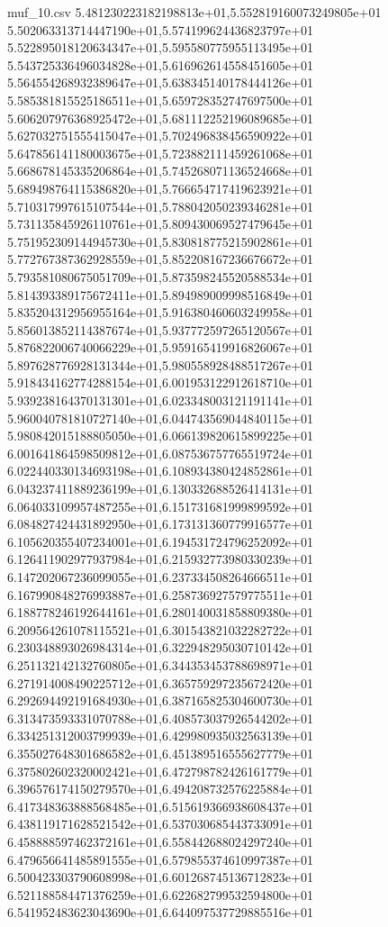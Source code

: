 \begin{filecontents*}{muf_10.csv}
5.481230223182198813e+01,5.552819160073249805e+01
5.502063313714447190e+01,5.574199624436823797e+01
5.522895018120634347e+01,5.595580775955113495e+01
5.543725336496034828e+01,5.616962614558451605e+01
5.564554268932389647e+01,5.638345140178444126e+01
5.585381815525186511e+01,5.659728352747697500e+01
5.606207976368925472e+01,5.681112252196089685e+01
5.627032751555415047e+01,5.702496838456590922e+01
5.647856141180003675e+01,5.723882111459261068e+01
5.668678145335206864e+01,5.745268071136524668e+01
5.689498764115386820e+01,5.766654717419623921e+01
5.710317997615107544e+01,5.788042050239346281e+01
5.731135845926110761e+01,5.809430069527479645e+01
5.751952309144945730e+01,5.830818775215902861e+01
5.772767387362928559e+01,5.852208167236676672e+01
5.793581080675051709e+01,5.873598245520588534e+01
5.814393389175672411e+01,5.894989009998516849e+01
5.835204312956955164e+01,5.916380460603249958e+01
5.856013852114387674e+01,5.937772597265120567e+01
5.876822006740066229e+01,5.959165419916826067e+01
5.897628776928131344e+01,5.980558928488517267e+01
5.918434162774288154e+01,6.001953122912618710e+01
5.939238164370131301e+01,6.023348003121191141e+01
5.960040781810727140e+01,6.044743569044840115e+01
5.980842015188805050e+01,6.066139820615899225e+01
6.001641864598509812e+01,6.087536757765519724e+01
6.022440330134693198e+01,6.108934380424852861e+01
6.043237411889236199e+01,6.130332688526414131e+01
6.064033109957487255e+01,6.151731681999899592e+01
6.084827424431892950e+01,6.173131360779916577e+01
6.105620355407234001e+01,6.194531724796252092e+01
6.126411902977937984e+01,6.215932773980330239e+01
6.147202067236099055e+01,6.237334508264666511e+01
6.167990848276993887e+01,6.258736927579775511e+01
6.188778246192644161e+01,6.280140031858809380e+01
6.209564261078115521e+01,6.301543821032282722e+01
6.230348893026984314e+01,6.322948295030710142e+01
6.251132142132760805e+01,6.344353453788698971e+01
6.271914008490225712e+01,6.365759297235672420e+01
6.292694492191684930e+01,6.387165825304600730e+01
6.313473593331070788e+01,6.408573037926544202e+01
6.334251312003799939e+01,6.429980935032563139e+01
6.355027648301686582e+01,6.451389516555627779e+01
6.375802602320002421e+01,6.472798782426161779e+01
6.396576174150279570e+01,6.494208732576225884e+01
6.417348363888568485e+01,6.515619366938608437e+01
6.438119171628521542e+01,6.537030685443733091e+01
6.458888597462372161e+01,6.558442688024297240e+01
6.479656641485891555e+01,6.579855374610997387e+01
6.500423303790608998e+01,6.601268745136712823e+01
6.521188584471376259e+01,6.622682799532594800e+01
6.541952483623043690e+01,6.644097537729885516e+01

\end{filecontents*}
